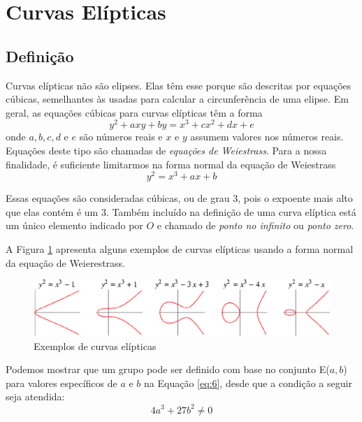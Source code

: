 %
%
\section{Curvas Elípticas}

\subsection{Definição}
Curvas elípticas não são elipses. Elas têm esse porque são descritas por equações cúbicas, semelhantes às usadas para calcular a circunferência de uma elipse. Em geral, as equações cúbicas para curvas elípticas têm a forma
\begin{equation}
y^2 + axy + by = x^3 + cx^2 + dx + e \label{eq:5}
\end{equation}
onde \(a, b, c, d\) e \(e\) são números reais e \(x\) e \(y\) assumem valores nos números reais. Equações deste tipo são chamadas de \textit{equações de Weiestrass}. Para a nossa finalidade, é suficiente limitarmos na forma normal da equação de Weiestrass
\begin{equation}
y^2 = x^3 + ax + b \label{eq:6}
\end{equation}

Essas equações são consideradas cúbicas, ou de grau 3, pois o expoente mais alto que elas contém é um 3. Também incluído na definição de uma curva elíptica está um único elemento indicado por \(O\) e chamado de \textit{ponto no infinito} ou \textit{ponto zero}.

A Figura \ref{fig:curvas} apresenta alguns exemplos de curvas elípticas usando a forma normal da equação de Weierestrass.

\begin{figure}[h]
\centering
\includegraphics[scale=0.5, bb=0 0 529 101]{figuras/curvas.eps}
\caption{Exemplos de curvas elípticas}
\label{fig:curvas}
\end{figure}

Podemos mostrar que um grupo pode ser definido com base no conjunto E(\(a, b\)) para valores específicos de \(a\) e \(b\) na Equação \ref{eq:6}, desde que a condição a seguir seja atendida:
\begin{equation}
4a^3 + 27b^2 \neq 0 \label{eq:7}
\end{equation}

